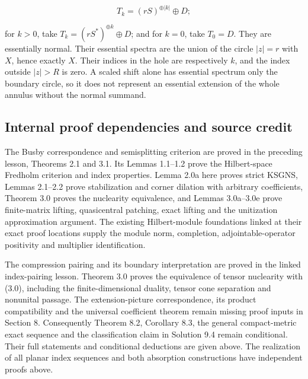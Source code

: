 \documentclass[
  11pt,
]{article}
\begin{document}
\[
T_k=(rS)^{\oplus|k|}\oplus D;
\]

for \(k>0\), take \(T_k=(rS^*)^{\oplus k}\oplus D\); and for \(k=0\),
take \(T_0=D\). They are essentially normal. Their essential spectra are
the union of the circle \(|z|=r\) with \(X\), hence exactly \(X\). Their
indices in the hole are respectively \(k\), and the index outside
\(|z|>R\) is zero. A scaled shift alone has essential spectrum only the
boundary circle, so it does not represent an essential extension of the
whole annulus without the normal summand.

\subsection{Internal proof dependencies and source
credit}\label{internal-proof-dependencies-and-source-credit}

The Busby correspondence and semisplitting criterion are proved in the
preceding lesson, Theorems 2.1 and 3.1. Its Lemmas 1.1--1.2 prove the
Hilbert-space Fredholm criterion and index properties. Lemma 2.0a here
proves strict KSGNS, Lemmas 2.1--2.2 prove stabilization and corner
dilation with arbitrary coefficients, Theorem 3.0 proves the nuclearity
equivalence, and Lemmas 3.0a--3.0e prove finite-matrix lifting,
quasicentral patching, exact lifting and the unitization approximation
argument. The existing Hilbert-module foundations linked at their exact
proof locations supply the module norm, completion, adjointable-operator
positivity and multiplier identification.

The compression pairing and its boundary interpretation are proved in
the linked index-pairing lesson. Theorem 3.0 proves the equivalence of
tensor nuclearity with (3.0), including the finite-dimensional duality,
tensor cone separation and nonunital passage. The extension-picture
correspondence, its product compatibility and the universal coefficient
theorem remain missing proof inputs in Section 8. Consequently Theorem
8.2, Corollary 8.3, the general compact-metric exact sequence and the
classification claim in Solution 9.4 remain conditional. Their full
statements and conditional deductions are given above. The realization
of all planar index sequences and both absorption constructions have
independent proofs above.
\end{document}
